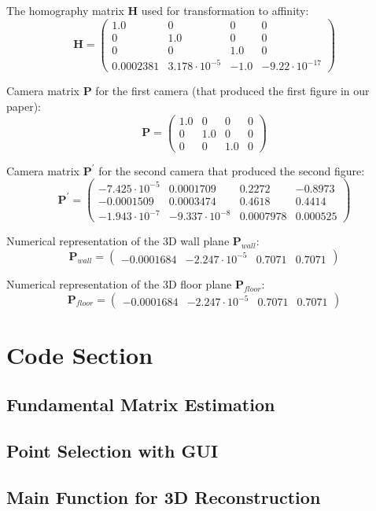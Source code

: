 \documentclass[conference]{IEEEtran}
\newcommand{\mat}[1]{\mathbf{#1}} %
\begin{document}
The homography matrix $\mat{H}$ used for transformation to affinity:
\begin{equation}
	\mat{H} = \left(\begin{array}{cccc} 1.0 & 0 & 0 & 0\\ 0 & 1.0 & 0 & 0\\ 0 & 0 & 1.0 & 0\\ 0.0002381 & 3.178\cdot 10^{-5} & -1.0 & -9.22\cdot 10^{-17} \end{array}\right)
\end{equation}

Camera matrix $\mat{P}$ for the first camera (that produced the first figure in our paper):
\begin{equation}
	\mat{P} = \left(\begin{array}{cccc} 1.0 & 0 & 0 & 0\\ 0 & 1.0 & 0 & 0\\ 0 & 0 & 1.0 & 0 \end{array}\right)
\end{equation}

Camera matrix $\mat{P}^\prime$ for the second camera that produced the second figure:
\begin{equation}
	\mat{P}^\prime = \left(\begin{array}{cccc} -7.425\cdot 10^{-5} & 0.0001709 & 0.2272 & -0.8973\\ -0.0001509 & 0.0003474 & 0.4618 & 0.4414\\ -1.943\cdot 10^{-7} & -9.337\cdot 10^{-8} & 0.0007978 & 0.000525 \end{array}\right)
\end{equation}

Numerical representation of the 3D wall plane $\mat{P}_{wall}$:
\begin{equation}
	\mat{P}_{wall} = \left(\begin{array}{cccc} -0.0001684 & -2.247\cdot 10^{-5} & 0.7071 & 0.7071 \end{array}\right)
\end{equation}

Numerical representation of the 3D floor plane $\mat{P}_{floor}$:
\begin{equation}
	\mat{P}_{floor} = \left(\begin{array}{cccc} -0.0001684 & -2.247\cdot 10^{-5} & 0.7071 & 0.7071 \end{array}\right)
\end{equation}

\newpage
\appendix
\section{Code Section}
\subsection{Fundamental Matrix Estimation}

\subsection{Point Selection with GUI}

\subsection{Main Function for 3D Reconstruction}

\end{document}
